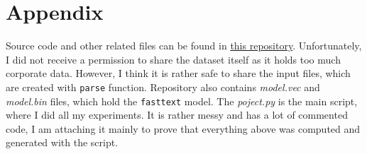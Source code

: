 \documentclass{article}
\begin{document}
\section{Appendix}

Source code and other related files can be found in \href{https://github.com/pavel-semenov-1/ml-project-public}{this repository}.
Unfortunately, I did not receive a permission to share the dataset itself as it holds too much corporate data.
However, I think it is rather safe to share the input files, which are created with \lstinline{parse} function.
Repository also contains \textit{model.vec} and \textit{model.bin} files, which hold the \lstinline{fasttext} model.
The \textit{poject.py} is the main script, where I did all my experiments. It is rather messy and has a lot of commented
code, I am attaching it mainly to prove that everything above was computed and generated with the script.
\end{document}
